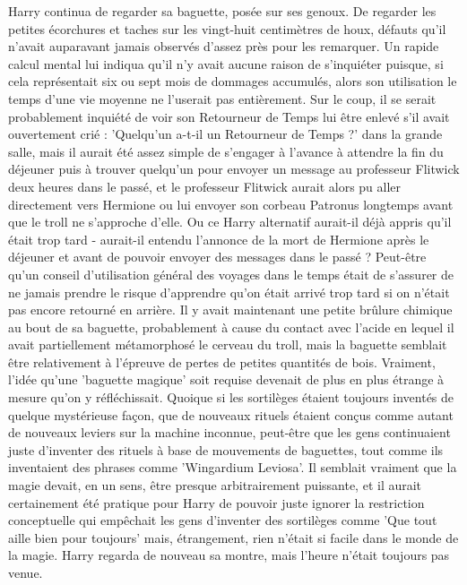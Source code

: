 Harry continua de regarder sa baguette, posée sur ses genoux. De regarder les petites écorchures et taches sur les vingt-huit centimètres de houx, défauts qu'il n'avait auparavant jamais observés d'assez près pour les remarquer. Un rapide calcul mental lui indiqua qu'il n'y avait aucune raison de s'inquiéter puisque, si cela représentait six ou sept mois de dommages accumulés, alors son utilisation le temps d'une vie moyenne ne l'userait pas entièrement. Sur le coup, il se serait probablement inquiété de voir son Retourneur de Temps lui être enlevé s'il avait ouvertement crié : 'Quelqu'un a-t-il un Retourneur de Temps ?' dans la grande salle, mais il aurait été assez simple de s'engager à l'avance à attendre la fin du déjeuner puis à trouver quelqu'un pour envoyer un message au professeur Flitwick deux heures dans le passé, et le professeur Flitwick aurait alors pu aller directement vers Hermione ou lui envoyer son corbeau Patronus longtemps avant que le troll ne s'approche d'elle. Ou ce Harry alternatif aurait-il déjà appris qu'il était trop tard - aurait-il entendu l'annonce de la mort de Hermione après le déjeuner et avant de pouvoir envoyer des messages dans le passé ? Peut-être qu'un conseil d'utilisation général des voyages dans le temps était de s'assurer de ne jamais prendre le risque d'apprendre qu'on était arrivé trop tard si on n'était pas encore retourné en arrière. Il y avait maintenant une petite brûlure chimique au bout de sa baguette, probablement à cause du contact avec l'acide en lequel il avait partiellement métamorphosé le cerveau du troll, mais la baguette semblait être relativement à l'épreuve de pertes de petites quantités de bois. Vraiment, l'idée qu'une 'baguette magique' soit requise devenait de plus en plus étrange à mesure qu'on y réfléchissait. Quoique si les sortilèges étaient toujours inventés de quelque mystérieuse façon, que de nouveaux rituels étaient conçus comme autant de nouveaux leviers sur la machine inconnue, peut-être que les gens continuaient juste d'inventer des rituels à base de mouvements de baguettes, tout comme ils inventaient des phrases comme 'Wingardium Leviosa'. Il semblait vraiment que la magie devait, en un sens, être presque arbitrairement puissante, et il aurait certainement été pratique pour Harry de pouvoir juste ignorer la restriction conceptuelle qui empêchait les gens d'inventer des sortilèges comme 'Que tout aille bien pour toujours' mais, étrangement, rien n'était si facile dans le monde de la magie. Harry regarda de nouveau sa montre, mais l'heure n'était toujours pas venue.

